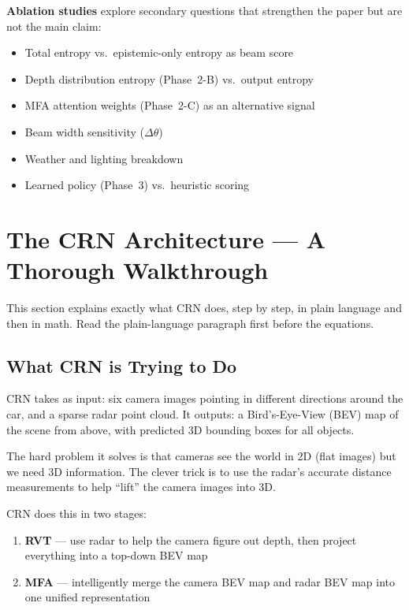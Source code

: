 \documentclass[12pt, a4paper]{article}
\theoremstyle{definition}
\begin{document}
\begin{ablationbox}
\textbf{Ablation studies} explore secondary questions that strengthen the paper
but are not the main claim:
\begin{itemize}
  \item Total entropy vs.\ epistemic-only entropy as beam score
  \item Depth distribution entropy (Phase~2-B) vs.\ output entropy
  \item MFA attention weights (Phase~2-C) as an alternative signal
  \item Beam width sensitivity ($\Delta\theta$)
  \item Weather and lighting breakdown
  \item Learned policy (Phase~3) vs.\ heuristic scoring
\end{itemize}
\end{ablationbox}

\section{The CRN Architecture --- A Thorough Walkthrough}
\label{sec:crn}

\begin{plainbox}
This section explains exactly what CRN does, step by step, in plain language
and then in math. Read the plain-language paragraph first before the equations.
\end{plainbox}

\subsection{What CRN is Trying to Do}

CRN takes as input: six camera images pointing in different directions around
the car, and a sparse radar point cloud. It outputs: a Bird's-Eye-View (BEV)
map of the scene from above, with predicted 3D bounding boxes for all objects.

The hard problem it solves is that cameras see the world in 2D (flat images)
but we need 3D information. The clever trick is to use the radar's accurate
distance measurements to help ``lift'' the camera images into 3D.

CRN does this in two stages:
\begin{enumerate}
  \item \textbf{RVT} --- use radar to help the camera figure out depth, then
        project everything into a top-down BEV map
  \item \textbf{MFA} --- intelligently merge the camera BEV map and radar BEV
        map into one unified representation
\end{enumerate}
\end{document}
